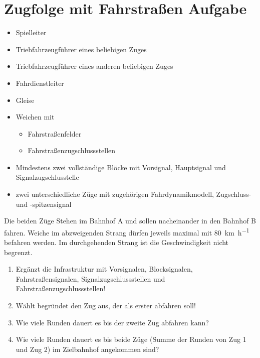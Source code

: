 

\section{Zugfolge mit Fahrstraßen Aufgabe}

  \roles
    \begin{itemize}
      \item Spielleiter
      \item Triebfahrzeugführer eines beliebigen Zuges
      \item Triebfahrzeugführer eines anderen beliebigen Zuges
      \item Fahrdienstleiter
    \end{itemize}

  \material
    \begin{itemize}
      \item Gleise
      \item Weichen mit
      \begin{itemize}
          \item Fahrstraßenfelder
          \item Fahrstraßenzugschlussstellen
      \end{itemize}
      \item Mindestens zwei vollständige Blöcke mit Vorsignal, Hauptsignal und Signalzugschlusstelle
      \item zwei unterschiedliche Züge mit zugehörigen Fahrdynamikmodell, Zugschluss- und -spitzensignal
    \end{itemize}

  \setup
    Die beiden Züge Stehen im Bahnhof A und sollen nacheinander in den Bahnhof B fahren. Weiche im abzweigenden Strang dürfen jeweils maximal mit \SI{80}{\kilo\metre\per\hour} befahren werden. Im durchgehenden Strang ist die Geschwindigkeit nicht begrenzt.

  \task
    \begin{enumerate}[label=\alph*)]
      \item Ergänzt die Infrastruktur mit Vorsignalen, Blocksignalen, Fahrstraßensignalen, Signalzugschlussstellen und Fahrstraßenzugschlussstellen!
      \item Wählt begründet den Zug aus, der als erster abfahren soll!
      \item Wie viele Runden dauert es bis der zweite Zug abfahren kann?
      \item Wie viele Runden dauert es bis beide Züge (Summe der Runden von Zug 1 und Zug 2) im Zielbahnhof angekommen sind?
    \end{enumerate}
